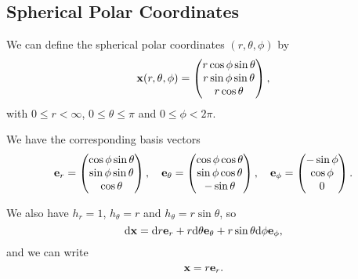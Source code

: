 \documentclass[a4paper]{scrreprt}
\begin{document}
 \subsection{Spherical Polar Coordinates}

 We can define the spherical polar coordinates $(r, \theta, \phi)$ by
 $$
\mathbf{x}(r, \theta, \phi) = \begin{pmatrix}
	r \cos \phi \sin \theta \\
	r \sin \phi \sin \theta \\
	r \cos \theta
\end{pmatrix},
 $$
 with $0 \leq r < \infty$, $0 \leq \theta \leq \pi$ and $0 \leq \phi < 2 \pi$.

 We have the corresponding basis vectors
$$
\mathbf{e}_r = \begin{pmatrix}
	\cos \phi \sin \theta \\
	\sin \phi \sin \theta \\
	\cos \theta
\end{pmatrix}, \quad \mathbf{e}_\theta = \begin{pmatrix}
	\cos \phi \cos \theta \\
	\sin \phi \cos \theta \\
	-\sin \theta
\end{pmatrix}, \quad \mathbf{e}_\phi = \begin{pmatrix}
	-\sin \phi \\
	\cos \phi \\
	 0
\end{pmatrix}.
$$

We also have $h_r = 1$, $h_\theta = r$ and $h_{\theta} = r \sin \theta$, so
$$
\mathrm{d} \mathbf{x} = \mathrm{d} r \mathbf{e}_r + r \mathrm{d} \theta \mathbf{e}_{\theta} + r \sin \theta \mathrm{d} \phi \mathbf{e}_\phi,
$$
and we can write
$$
\mathbf{x} = r \mathbf{e}_r.
$$
\end{document}
